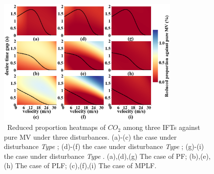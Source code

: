\documentclass[journal]{IEEEtran}
\begin{document}
\begin{table}
  \centering
  \setlength{\abovecaptionskip}{0pt}
  \setlength{\belowcaptionskip}{10pt}%
  \caption{~Parameters for Emission Model of Petrol Car.}
  \label{Table3}
\end{table}

\begin{figure}
  \includegraphics[width=9cm]{fig5.4_1.png}
  \caption{~Reduced proportion heatmaps of $CO_2$ among three IFTs against pure MV under three disturbances. (a)-(c) the case under disturbance \textit{Type \uppercase\expandafter{}}; (d)-(f) the case under disturbance \textit{Type \uppercase\expandafter{}}; (g)-(i) the case under disturbance \textit{Type \uppercase\expandafter{}}. (a),(d),(g) The case of PF; (b),(e),(h) The case of PLF; (c),(f),(i) The case of MPLF.}
  \label{fig5.4_1}
\end{figure}
\end{document}

